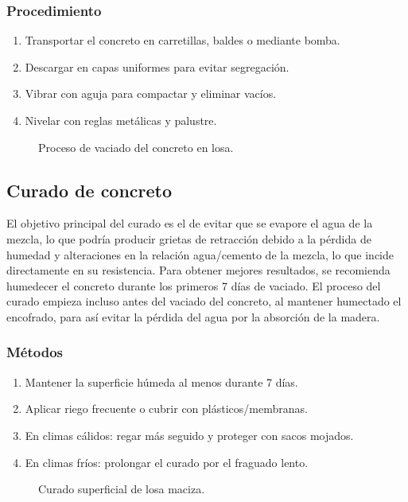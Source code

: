 \documentclass[12pt]{article}
\begin{document}
	\subsubsection{Procedimiento}
	\begin{enumerate}
		\item Transportar el concreto en carretillas, baldes o mediante bomba.
		\item Descargar en capas uniformes para evitar segregación.
		\item Vibrar con aguja para compactar y eliminar vacíos.
		\item Nivelar con reglas metálicas y palustre.
	\end{enumerate}
	
	\begin{figure}[h]
		\centering
		\caption{Proceso de vaciado del concreto en losa.}
	\end{figure}
	
	\subsection{Curado de concreto}
	El objetivo principal del curado es el de evitar que se evapore el agua de la
	mezcla, lo que podría producir grietas de retracción debido a la pérdida de
	humedad y alteraciones en la relación agua/cemento de la mezcla, lo que incide
	directamente en su resistencia. Para obtener mejores resultados, se recomienda
	humedecer el concreto durante los primeros 7 días de vaciado.
	El proceso del curado empieza incluso antes del vaciado del concreto, al mantener
	humectado el encofrado, para así evitar la pérdida del agua por la absorción de la
	madera.
	
	\subsubsection{Métodos}
	\begin{enumerate}
		\item Mantener la superficie húmeda al menos durante 7 días.
		\item Aplicar riego frecuente o cubrir con plásticos/membranas.
		\item En climas cálidos: regar más seguido y proteger con sacos mojados.
		\item En climas fríos: prolongar el curado por el fraguado lento.
	\end{enumerate}
	
	\begin{figure}[h]
		\centering
		\caption{Curado superficial de losa maciza.}
	\end{figure}
	
\end{document}
